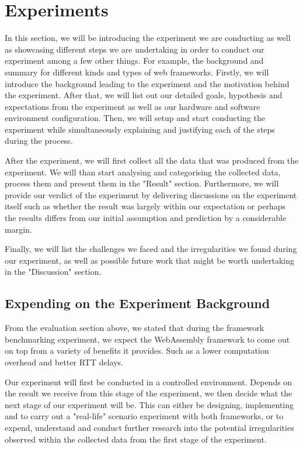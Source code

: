 \chapter{Experiments} \label{chap:experiments}

In this section, we will be introducing the experiment we are conducting as well as showcasing different steps we are undertaking in order to conduct our experiment among a few other things. For example, the background and summary for different kinds and types of web frameworks. Firstly, we will introduce the background leading to the experiment and the motivation behind the experiment. After that, we will list out our detailed goals, hypothesis and expectations from the experiment as well as our hardware and software environment configuration. Then, we will setup and start conducting the experiment while simultaneously explaining and justifying each of the steps during the process.

After the experiment, we will first collect all the data that was produced from the experiment. We will than start analysing and categorising the collected data, process them and present them in the "Result" section. Furthermore, we will provide our verdict of the experiment by delivering discussions on the experiment itself such as whether the result was largely within our expectation or perhaps the results differs from our initial assumption and prediction by a considerable margin.

Finally, we will list the challenges we faced and the irregularities we found during our experiment, as well as possible future work that might be worth undertaking in the "Discussion" section.

\bigskip
\section{Expending on the Experiment Background}

From the evaluation section above, we stated that during the framework benchmarking experiment, we expect the WebAssembly framework to come out on top from a variety of benefits it provides. Such as a lower computation overhead and better RTT delays.

Our experiment will first be conducted in a controlled environment. Depends on the result we receive from this stage of the experiment, we then decide what the next stage of our experiment will be. This can either be designing, implementing and to carry out a "real-life" scenario experiment with both frameworks, or to expend, understand and conduct further research into the potential irregularities observed within the collected data from the first stage of the experiment.

